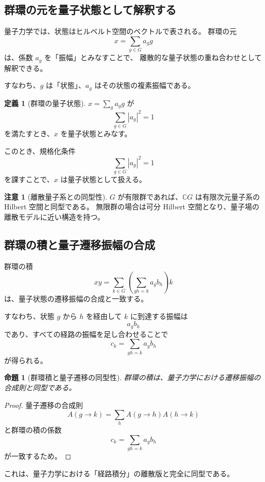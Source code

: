 \documentclass[12pt,a4paper]{ltjarticle}
\newtheorem*{proposition}{命題}
\theoremstyle{definition}
\newtheorem*{definition}{定義}
\newtheorem*{remark}{注意}
\begin{document}
\subsection{群環の元を量子状態として解釈する}

量子力学では、状態はヒルベルト空間のベクトルで表される。
群環の元
\[
x = \sum_{g \in G} a_g g
\]
は、係数 $a_g$ を「振幅」とみなすことで、
離散的な量子状態の重ね合わせとして解釈できる。

すなわち、$g$ は「状態」、$a_g$ はその状態の複素振幅である。

\begin{definition}[群環の量子状態]
$x=\sum_g a_g g$ が
\[
\sum_{g\in G}|a_g|^2=1
\]
を満たすとき、$x$ を量子状態とみなす。
\end{definition}

このとき、規格化条件
\[
\sum_{g \in G} |a_g|^2 = 1
\]
を課すことで、$x$ は量子状態として扱える。

\begin{remark}[離散量子系との同型性]
$G$ が有限群であれば、$\mathbb{C}G$ は有限次元量子系の Hilbert 空間と同型である。
無限群の場合は可分 Hilbert 空間となり、量子場の離散モデルに近い構造を持つ。
\end{remark}

\subsection{群環の積と量子遷移振幅の合成}

群環の積
\[
xy = \sum_{k \in G} \left( \sum_{gh=k} a_g b_h \right) k
\]
は、量子状態の遷移振幅の合成と一致する。

すなわち、状態 $g$ から $h$ を経由して $k$ に到達する振幅は
\[
a_g b_h
\]
であり、すべての経路の振幅を足し合わせることで
\[
c_k = \sum_{gh=k} a_g b_h
\]
が得られる。

\begin{proposition}[群環積と量子遷移の同型性]
群環の積は、量子力学における遷移振幅の合成則と同型である。
\end{proposition}

\begin{proof}
量子遷移の合成則
\[
A(g\to k)=\sum_h A(g\to h)A(h\to k)
\]
と群環の積の係数
\[
c_k=\sum_{gh=k}a_g b_h
\]
が一致するため。
\end{proof}

これは、量子力学における「経路積分」の離散版と完全に同型である。
\end{document}
